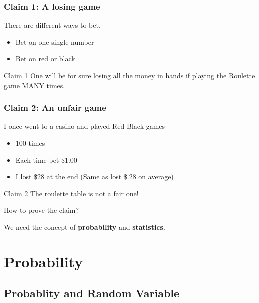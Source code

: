 \documentclass[
  ignorenonframetext,
]{beamer}
\providecommand{\tightlist}{%
  \setlength{\itemsep}{0pt}\setlength{\parskip}{0pt}}
\begin{document}
\begin{frame}
\frametitle{Claim 1: A losing game}

There are different ways to bet.

\begin{itemize}
\tightlist
\item
  Bet on one single number
\item
  Bet on red or black
\end{itemize}

\vspace{.2in}

\begin{block}{Claim 1}
One will be for sure losing all the money in hands if playing the Roulette game MANY times.
\end{block}
\end{frame}

\begin{frame}
\frametitle{Claim 2: An unfair game}

I once went to a casino and played Red-Black games

\begin{itemize}
\tightlist
\item
  100 times
\item
  Each time bet \$1.00
\item
  I lost \$28 at the end (Same as lost \$.28 on average)
\end{itemize}

\vspace{.2in}

\begin{block}{Claim 2}
The roulette table is not a fair one!
\end{block}

How to prove the claim?

We need the concept of \textbf{probability} and \textbf{statistics}.
\end{frame}

\hypertarget{probability}{%
\section{Probability}\label{probability}}

\hypertarget{probablity-and-random-variable}{%
\subsection{Probablity and Random
Variable}\label{probablity-and-random-variable}}
\end{document}
